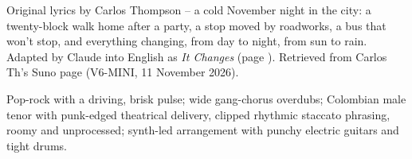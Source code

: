
\label{sec:noviembre}
\begin{notes}
Original lyrics by Carlos Thompson -- a cold November night in the city: a twenty-block walk home after a party, a stop moved by roadworks, a bus that won't stop, and everything changing, from day to night, from sun to rain. Adapted by Claude into English as \emph{It Changes} (page \pageref{sec:it-changes}). Retrieved from Carlos Th's Suno page (V6-MINI, 11 November 2026).
\end{notes}
\begin{style}
Pop-rock with a driving, brisk pulse; wide gang-chorus overdubs; Colombian male tenor with punk-edged theatrical delivery, clipped rhythmic staccato phrasing, roomy and unprocessed; synth-led arrangement with punchy electric guitars and tight drums.
\end{style}
